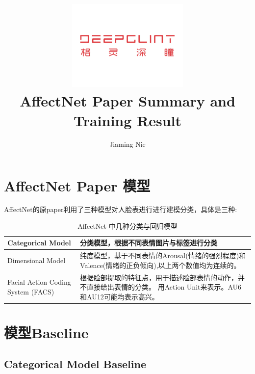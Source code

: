 \documentclass[11pt, a4paper]{article}
\title{\includegraphics[width=0.45\textwidth]{dg}
        \\AffectNet Paper Summary and Training Result  }          %
\author{Jiaming Nie}                    %
\begin{document}
\begin{titlepage}
	
\maketitle
{}

\thispagestyle{empty}  %

\end{titlepage}




\begin{CJK}{UTF8}{gbsn}
	
\section{AffectNet Paper 模型}

AffectNet的原paper利用了三种模型对人脸表进行进行建模分类，具体是三种:

\begin{table}[htbp] 
	\begin{center}
		\caption{AffectNet 中几种分类与回归模型}
		\begin{tabular}{|l|p{270pt}|} \hline
			Categorical Model & 分类模型，根据不同表情图片与标签进行分类   \\ \hline
			Dimensional Model & 纬度模型，基于不同表情的Arousal(情绪的强烈程度)和Valence(情绪的正负倾向),以上两个数值均为连续的。\\ \hline
			Facial Action Coding System (FACS) &  根据脸部提取的特征点，用于描述脸部表情的动作，并不直接给出表情的分类。 用Action Unit来表示。AU6和AU12可能均表示高兴。\\ \hline
		\end{tabular}
		
		\label{tab:kf_meaning}
	\end{center}
\end{table}

\section{模型Baseline}

\subsection{Categorical Model Baseline}


\end{CJK}
\end{document}
